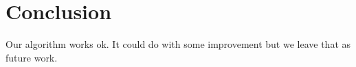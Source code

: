\section{Conclusion}
\label{sec:conclude}

Our algorithm works ok.
It could do with some improvement but we leave that as future work.

